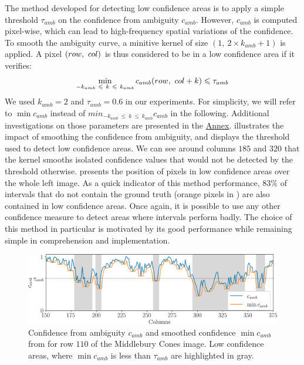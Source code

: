 The method developed for detecting low confidence areas is to apply a simple threshold $\tau_{amb}$ on the confidence from ambiguity $c_{amb}$. However, $c_{amb}$ is computed pixel-wise, which can lead to high-frequency spatial variations of the confidence. To smooth the ambiguity curve, a minitive kernel of size $(1, ~2\times k_{amb}+1)$ is applied. A pixel $(row, ~col)$ is thus considered to be in a low confidence area if it verifies:
\begin{align}\label{eq:low_confidence_area}
    \min_{-k_{amb}~\leqslant~ k~\leqslant ~k_{amb}}c_{amb}(row, ~col+k)\leqslant \tau_{amb}
\end{align}
We used $k_{amb}=2$ and $\tau_{amb}=0.6$ in our experiments. For simplicity, we will refer to $\min c_{amb}$ instead of $min_{-k_{amb}~\leqslant~ k~\leqslant ~k_{amb}}c_{amb}$ in the following. Additional investigations on those parameters are presented in the \hyperref[chap:annex]{Annex}.  illustrates the impact of smoothing the confidence from ambiguity, and displays the threshold used to detect low confidence areas. We can see around columns $185$ and $320$ that the kernel smooths isolated confidence values that would not be detected by the threshold otherwise.  presents the position of pixels in low confidence areas over the whole left image. As a quick indicator of this method performance, $83\%$ of intervals that do not contain the ground truth (orange pixels in ) are also contained in low confidence areas. Once again, it is possible to use any other confidence measure to detect areas where intervals perform badly. The choice of this method in particular is motivated by its good performance while remaining simple in comprehension and implementation.

\begin{figure}
    \centering
    \includegraphics[width=\linewidth]{Images/Chap_5/ambiguity_kernel_row_110.png}
    \caption{Confidence from ambiguity $c_{amb}$ and smoothed confidence $\min c_{amb}$ from  for row $110$ of the Middlebury Cones image. Low confidence areas, where $\min c_{amb}$ is less than $\tau_{amb}$ are highlighted in gray.}
    \label{fig:ambiguity_kernel}
\end{figure}

